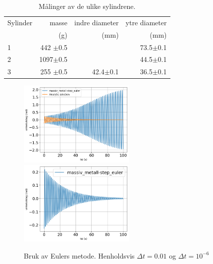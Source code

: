 \documentclass[5p]{elsarticle}
\begin{document}
\begin{table}[htb]
	\begin{center}
		\caption{Målinger av de ulike sylindrene.}
		\label{MinLilleTabell}	%
		\begin{tabular}{lrrr} 		%
			\hline 								%
		    Sylinder &  masse  & indre diameter & ytre diameter \\ %
			&  (g)    &   (mm)   &  (mm)    \\ %
			\hline												
			1   &  442 \(\pm\)0.5 & 	  & 73.5\(\pm\)0.1 \\ %
			2   &  1097\(\pm\)0.5 & 	  & 44.5\(\pm\)0.1 \\ %
			3   &  255 \(\pm\)0.5 & 42.4\(\pm\)0.1 & 36.5\(\pm\)0.1 \\ %
			\hline
		\end{tabular}
	\end{center}
\end{table}


\begin{figure}[] 
	\begin{center}
        	\includegraphics[width=0.5\textwidth]{Plots/Saved-Plots/combined-analytic/massiv_metall-step_euler.png}
        	\includegraphics[width=0.5\textwidth]{Plots/Saved-Plots/step_euler-2b-small_dt/massiv_metall-step_euler-plot.png}
        \end{center}
	\caption{Bruk av Eulers metode. Henholdsvis \(\Delta t = 0.01\) og \(\Delta t = 10^{-6}\)}
	\label{Fig step-Euler} %
\end{figure}
\end{document}
